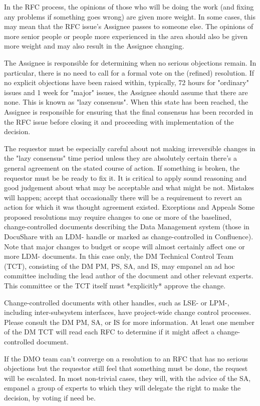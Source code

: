 \begin{itemize}
In the RFC process, the opinions of those who will be doing the work (and fixing any problems if something goes wrong) are given more weight. In some cases, this may mean that the RFC issue's Assignee passes to someone else. The opinions of more senior people or people more experienced in the area should also be given more weight and may also result in the Assignee changing.

The Assignee is responsible for determining when no serious objections remain.  In particular, there is no need to call for a formal vote on the (refined) resolution. If no explicit objections have been raised within, typically, 72 hours for "ordinary" issues and 1 week for "major" issues, the Assignee should assume that there are none. This is known as "lazy consensus". When this state has been reached, the Assignee is responsible for ensuring that the final consensus has been recorded in the RFC issue before closing it and proceeding with implementation of the decision.

The requestor must be especially careful about not making irreversible changes in the "lazy consensus" time period unless they are absolutely certain there's a general agreement on the stated course of action. If something is broken, the requestor must be be ready to fix it. It is critical to apply sound reasoning and good judgement about what may be acceptable and what might be not. Mistakes will happen; accept that occasionally there will be a requirement to revert an action for which it was thought agreement existed.
Exceptions and Appeals
Some proposed resolutions may require changes to one or more of the baselined, change-controlled documents describing the Data Management system (those in DocuShare with an LDM- handle or marked as change-controlled in Confluence).  Note that major changes to budget or scope will almost certainly affect one or more LDM- documents.  In this case only, the DM Technical Control Team (TCT), consisting of the DM PM, PS, SA, and IS, may empanel an ad hoc committee including the lead author of the document and other relevant experts. This committee or the TCT itself must *explicitly* approve the change.

Change-controlled documents with other handles, such as LSE- or LPM-, including inter-subsystem interfaces, have project-wide change control processes. Please consult the DM PM, SA, or IS for more information.
At least one member of the DM TCT will read each RFC to determine if it might affect a change-controlled document.

If the DMO team can't converge on a resolution to an RFC that has no serious objections but the requestor still feel that something must be done, the request will be escalated. In most non-trivial cases, they will, with the advice of the SA, empanel a group of experts to which they will delegate the right to make the decision, by voting if need be.


\end{itemize}
